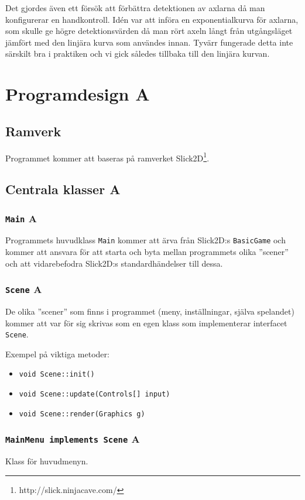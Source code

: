 \documentclass[a4paper,11pt]{article}
\begin{document}
Det gjordes även ett försök att förbättra detektionen av axlarna
då man konfigurerar en handkontroll. Idén var att införa en exponentialkurva
för axlarna, som skulle ge högre detektionsvärden då man rört axeln långt
från utgångsläget jämfört med den linjära kurva som användes innan. Tyvärr
fungerade detta inte särskilt bra i praktiken och vi gick således tillbaka
till den linjära kurvan.

\section{Programdesign A}
\subsection{Ramverk}
Programmet kommer att baseras på ramverket Slick2D\footnote{http://slick.ninjacave.com/}.

\subsection{Centrala klasser A}
\subsubsection{\texttt{Main} A}
\noindent Programmets huvudklass \texttt{Main} kommer att ärva från
Slick2D:s \texttt{BasicGame} och kommer att ansvara för att starta och
byta mellan programmets olika ''scener'' och att vidarebefodra Slick2D:s
standardhändelser till dessa.

\subsubsection{\texttt{Scene} A}
\noindent De olika ''scener'' som finns i programmet (meny, inställningar,
själva spelandet) kommer att var för sig skrivas som en egen klass
som implementerar interfacet \texttt{Scene}.

\bigskip
\noindent Exempel på viktiga metoder:
\begin{itemize}
\item \texttt{void Scene::init()}
\item \texttt{void Scene::update(Controls[] input)}
\item \texttt{void Scene::render(Graphics g)}
\end{itemize}

\subsubsection{\texttt{MainMenu implements Scene} A}
\noindent Klass för huvudmenyn.
\end{document}
